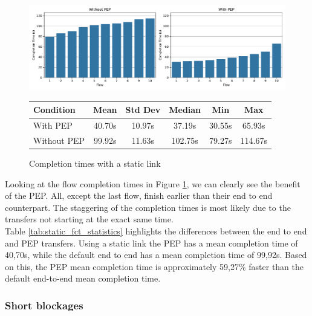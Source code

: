 \documentclass[a4paper,english, 11pt]{report}
\begin{document}
\begin{figure}[h!] %
	\centering
	\includegraphics[scale=0.40]{../diagrams/witestlab/sl_cubic_bar.pdf}\\
	
	\centering
	\begin{tabularx}{\linewidth}{lCCCCC}
	Condition & Mean & Std Dev & Median & Min & Max \\
	\midrule
	With PEP & 40.70s & 10.97s & 37.19s & 30.55s & 65.93s\\
	Without PEP & 99.92s & 11.63s & 102.75s & 79.27s & 114.67s\\
	\bottomrule
	\end{tabularx}		
		
  	\caption{Completion times with a static link}
  	\label{fig:witestlab_static_fcts}
\end{figure}

Looking at the flow completion times in Figure \ref{fig:witestlab_static_fcts}, we can clearly see the benefit of the PEP. All, except the last flow, finish earlier than their end to end counterpart. The staggering of the completion times is most likely due to the transfers not starting at the exact same time.\\

Table \ref{tab:static_fct_statistics} highlights the differences between the end to end and PEP transfers. Using a static link the PEP has a mean completion time of 40,70s, while the default end to end has a mean completion time of 99,92s. Based on this, the PEP mean completion time is approximately 59,27\% faster than the default end-to-end mean completion time.

\subsubsection{Short blockages}
\end{document}
